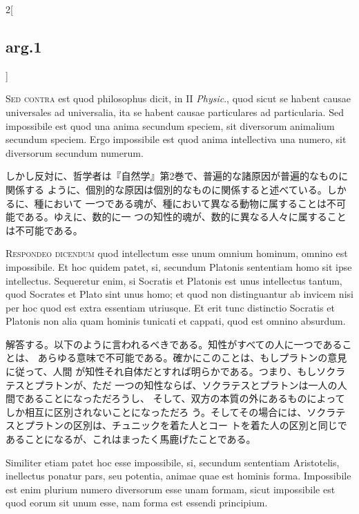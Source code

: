 \documentclass[paper=a4paper,fontsize=10pt,jafontsize=9pt,titlepage]{jlreq}
\begin{document}
\begin{paracol}{2}[\subsection{arg.1}]
\switchcolumn*[\subsection{s.c.}]

{\scshape Sed contra} est quod philosophus dicit, in II {\itshape Physic}., quod
sicut se habent causae universales ad universalia, ita se habent causae
particulares ad particularia. Sed impossibile est quod una anima secundum
speciem, sit diversorum animalium secundum speciem. Ergo impossibile est quod
anima intellectiva una numero, sit diversorum secundum numerum.

\switchcolumn

 しかし反対に、哲学者は『自然学』第2巻で、普遍的な諸原因が普遍的なものに関係する
 ように、個別的な原因は個別的なものに関係すると述べている。しかるに、種において
 一つである魂が、種において異なる動物に属することは不可能である。ゆえに、数的に一
 つの知性的魂が、数的に異なる人々に属することは不可能である。

 


{\scshape Respondeo dicendum} quod intellectum esse unum omnium hominum, omnino
 est impossibile. Et hoc quidem patet, si, secundum Platonis sententiam homo sit
 ipse intellectus. Sequeretur enim, si Socratis et Platonis est unus intellectus
 tantum, quod Socrates et Plato sint unus homo; et quod non distinguantur ab
 invicem nisi per hoc quod est extra essentiam utriusque. Et erit tunc
 distinctio Socratis et Platonis non alia quam hominis tunicati et cappati, quod
 est omnino absurdum.

\switchcolumn

 解答する。以下のように言われるべきである。知性がすべての人に一つであることは、
 あらゆる意味で不可能である。確かにこのことは、もしプラトンの意見に従って、人間
 が知性それ自体だとすれば明らかである。つまり、もしソクラテスとプラトンが、ただ
 一つの知性ならば、ソクラテスとプラトンは一人の人間であることになっただろうし、
 そして、双方の本質の外にあるものによってしか相互に区別されないことになっただろ
 う。そしてその場合には、ソクラテスとプラトンの区別は、チュニックを着た人とコー
 トを着た人の区別と同じであることになるが、これはまったく馬鹿げたことである。
 
\switchcolumn*

 Similiter etiam patet hoc esse impossibile, si, secundum sententiam
 Aristotelis, inellectus ponatur pars, seu potentia, animae quae est hominis
 forma. Impossibile est enim plurium numero diversorum esse unam formam, sicut
 impossibile est quod eorum sit unum esse, nam forma est essendi principium.


\end{paracol}
\end{document}
